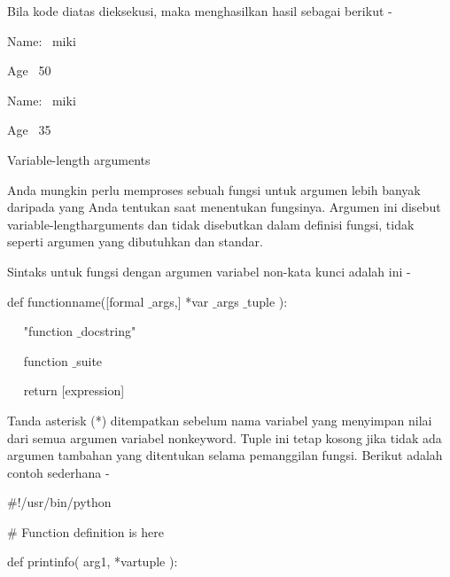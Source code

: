 \noindent 
Bila kode diatas dieksekusi, maka menghasilkan hasil sebagai berikut - \par
\noindent 
 \hspace*{0.5in} Name:~ miki \par
\noindent 
 \hspace*{0.5in} Age~ 50 \par
\noindent 
 \hspace*{0.5in} Name:~ miki \par
\noindent 
 \hspace*{0.5in} Age~ 35 \par
\vspace{12pt}
\noindent 
Variable-length arguments \par
\noindent 
Anda mungkin perlu memproses sebuah fungsi untuk argumen lebih banyak daripada yang Anda tentukan saat menentukan fungsinya. Argumen ini disebut variable-lengtharguments dan tidak disebutkan dalam definisi fungsi, tidak seperti argumen yang dibutuhkan dan standar. \par
\noindent 
Sintaks untuk fungsi dengan argumen variabel non-kata kunci adalah ini - \par
\noindent 
 \hspace*{0.5in} def functionname([formal $  \_  $args,] *var $  \_  $args $  \_  $tuple ): \par
\noindent 
 \hspace*{0.5in} ~~ "function $  \_  $docstring" \par
\noindent 
 \hspace*{0.5in} ~~ function $  \_  $suite \par
\noindent 
 \hspace*{0.5in} ~~ return [expression] \par
\noindent 
Tanda asterisk (*) ditempatkan sebelum nama variabel yang menyimpan nilai dari semua argumen variabel nonkeyword. Tuple ini tetap kosong jika tidak ada argumen tambahan yang ditentukan selama pemanggilan fungsi. Berikut adalah contoh sederhana - \par
\noindent 
 \hspace*{0.5in}  $  \#  $!/usr/bin/python \par
\vspace{12pt}
\noindent 
 \hspace*{0.5in}  $  \#  $ Function definition is here \par
\noindent 
 \hspace*{0.5in} def printinfo( arg1, *vartuple ): \par
